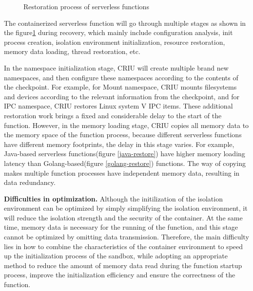\begin{figure}[t]
    \centering
    \caption{Restoration process of serverless functions}
    \label{restore-process}
\end{figure}

The containerized serverless function will go through multiple stages as shown in the figure\ref{restore-process} during recovery,
which mainly include configuration analysis,
init process creation,
isolation environment initialization,
resource restoration,
memory data loading,
thread restoration, etc.

In the namespace initialization stage,
CRIU will create multiple brand new namespaces,
and then configure these namespaces according to the contents of the checkpoint.
For example,
for Mount namespace,
CRIU mounts filesystems and devices according to the relevant information from the checkpoint, and for IPC namespace,
CRIU restores Linux system V IPC items.
These additional restoration work brings a fixed and considerable delay to the start of the function.
However, in the memory loading stage,
CRIU copies all memory data to the memory space of the function process,
because different serverless functions have different memory footprints,
the delay in this stage varies.
For example,
Java-based serverless functions(figure \ref{java-restore}) have higher memory loading latency than Golang-based(figure \ref{golang-restore}) functions. 
The way of copying makes multiple function processes have independent memory data, 
resulting in data redundancy.

\textbf{Difficulties in optimization.} Although the initilization of the isolation environment can be optimized by simply simplifying the isolation environment, 
it will reduce the isolation strength and the security of the container. 
At the same time, memory data is necessary for the running of the function, and this stage cannot be optimized by omitting data transmission. 
Therefore, 
the main difficulty lies in how to combine the characteristics of the container environment to speed up the initialization process of the sandbox, 
while adopting an appropriate method to reduce the amount of memory data read during the function startup process, 
improve the initialization efficiency and ensure the correctness of the function.